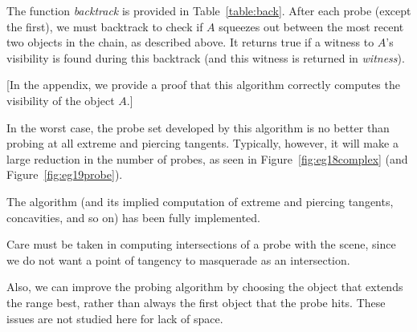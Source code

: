 \documentclass[10pt,twocolumn]{article}
\newif\ifJournal
\begin{document}
The function {\em backtrack} is provided in Table~\ref{table:back}.
After each probe (except the first), we must backtrack to check if $A$ 
squeezes out between the most recent two objects in the chain, as described above.
It returns true if a witness to $A$'s visibility is found
during this backtrack (and this witness is returned in {\em witness}).

\ifJournal
Trace through an example, based on EG18 (Figure~\ref{fig:eg19probe}).
Trace through another example, based on EG19 (apparently in concavities, but test does
not need to change) (Figure~\ref{fig:probe}).
\fi

\ifJournal
A proof that this algorithm detects visibility follows.
\fi

[In the appendix, we provide a proof that this algorithm 
correctly computes the visibility of the object $A$.]

\ifJournal %
We can improve the algorithm for {\em objectvisibility} by reinterpreting
probe(RAY).
Rather than choosing the first object hit by the probe, we could technically
choose any object that is hit before A: we are just looking for an object that blocks 
the probe.
The optimal choice is the object before A that extends the covered range the most.
We prefer to use this version of the algorithm, where probe(RAY) is the object
hit by the probe RAY before A that most extends the covered range (i.e., whose clockwise
extreme tangent is furthest clockwise).
\fi

In the worst case, the probe set developed by this algorithm is no better than 
probing at all extreme and piercing tangents.
Typically, however, it will make a large reduction in the number of probes,
as seen in Figure~\ref{fig:eg18complex} (and Figure~\ref{fig:eg19probe}).

The algorithm (and its implied computation of extreme and piercing tangents,
concavities, and so on) has been fully implemented.

Care must be taken in computing intersections of a probe with the scene,
since we do not want a point of tangency to masquerade as an intersection.
\ifJournal
Solution is to ignore intersections within some feature size of the point of tangency.
(Except with the first probe, don't ignore: count pt of tangency as first intersection 
if nothing comes before it.)
\fi
%
Also, we can improve the probing algorithm by choosing the object that extends the range
best, rather than always the first object that the probe hits.
These issues are not studied here for lack of space.
\end{document}
